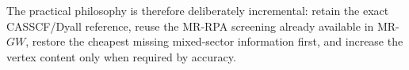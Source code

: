 \documentclass[aip,jcp,reprint,noshowkeys,superscriptaddress]{revtex4-1}
\begin{document}
The practical philosophy is therefore deliberately incremental:
retain the exact CASSCF/Dyall reference, reuse the MR-RPA screening already
available in MR-$GW$, restore the cheapest missing mixed-sector information
first, and increase the vertex content only when required by accuracy.


\end{document}
